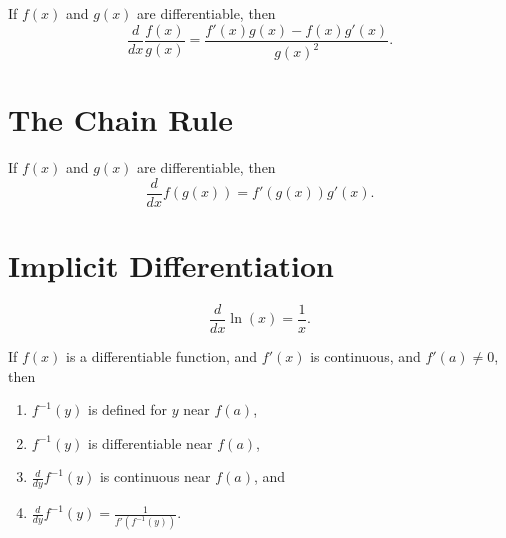 \documentclass{ximera}
\newcommand{\dd}[2][]{\frac{d #1}{d #2}}
\newcommand{\ddx}{\frac{d}{dx}}
\begin{document}
\begin{theorem}\label{theorem:quotient-rule}
If $f(x)$ and $g(x)$ are differentiable, then
\[
\ddx \frac{f(x)}{g(x)} = \frac{f'(x)g(x)-f(x)g'(x)}{g(x)^2}.
\]
\end{theorem}








\section{The Chain Rule}






\begin{theorem}
If $f(x)$ and $g(x)$ are differentiable, then
\[
\ddx f(g(x)) = f'(g(x))g'(x).
\]
\end{theorem}







\section{Implicit Differentiation}






\begin{theorem}
\[
\ddx \ln(x) = \frac{1}{x}.
\]
\end{theorem}



\begin{theorem}\label{theorem:IFT}
If $f(x)$ is a differentiable function, and $f'(x)$ is continuous, and
$f'(a) \neq 0$, then
\begin{enumerate}
\item $f^{-1}(y)$ is defined for $y$ near $f(a)$,
\item $f^{-1}(y)$ is differentiable near $f(a)$,
\item $\dd{y} f^{-1}(y)$ is continuous near $f(a)$, and
\item $\dd{y} f^{-1}(y) = \displaystyle\frac{1}{f'(f^{-1}(y))}$.
\end{enumerate}
\end{theorem}
\end{document}

